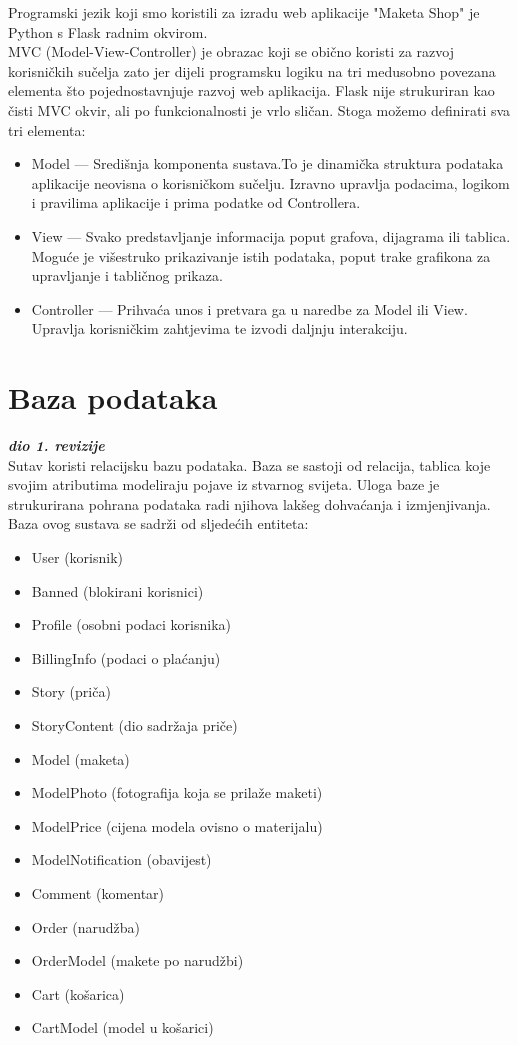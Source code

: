 		Programski jezik koji smo koristili za izradu web aplikacije "Maketa Shop" je Python s Flask radnim okvirom.\\
		
		MVC (Model-View-Controller) je obrazac koji se obično koristi za razvoj korisničkih sučelja zato jer dijeli programsku	logiku na tri medusobno povezana elementa što pojednostavnjuje razvoj web	aplikacija. Flask nije strukuriran kao čisti MVC okvir, ali po funkcionalnosti je vrlo sličan. Stoga možemo definirati sva tri elementa: 
		\begin{itemize}
			\item Model --- Središnja komponenta sustava.To je dinamička struktura podataka aplikacije neovisna o korisničkom sučelju. Izravno upravlja podacima, logikom i pravilima aplikacije i prima podatke od Controllera.
			\item View --- Svako predstavljanje informacija poput grafova, dijagrama ili tablica. Moguće je višestruko prikazivanje istih podataka, poput trake grafikona za upravljanje i tabličnog prikaza.
			\item Controller --- Prihvaća unos i pretvara ga u naredbe za Model ili View. Upravlja	korisničkim zahtjevima te izvodi daljnju interakciju.
		\end{itemize}
				
		\section{Baza podataka}
			
			\textbf{\textit{dio 1. revizije}}\\
			
			\noindent Sutav koristi relacijsku bazu podataka. Baza se sastoji od relacija, tablica koje svojim atributima modeliraju pojave iz stvarnog svijeta. Uloga baze je strukurirana pohrana  podataka radi njihova lakšeg dohvaćanja i izmjenjivanja. Baza ovog sustava se sadrži od sljedećih entiteta:
			\begin{itemize}
				\item User (korisnik)
				\item Banned (blokirani korisnici)
				\item Profile (osobni podaci korisnika)
				\item BillingInfo (podaci o plaćanju)
				\item Story (priča)
				\item StoryContent (dio sadržaja priče) 
				\item Model (maketa)
				\item ModelPhoto (fotografija koja se prilaže maketi)
				\item ModelPrice (cijena modela ovisno o materijalu)
				\item ModelNotification (obavijest)
				\item Comment (komentar)
				\item Order (narudžba)
				\item OrderModel (makete po narudžbi)
				\item Cart (košarica)
				\item CartModel (model u košarici)
			\end{itemize}
		

